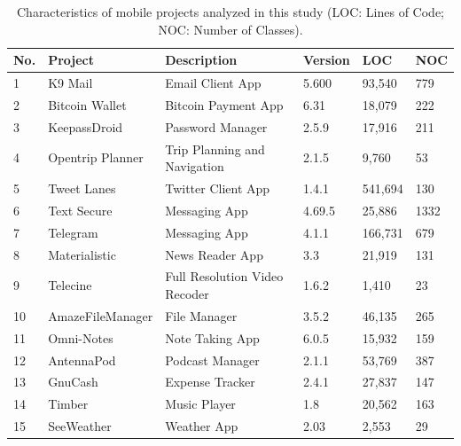 \documentclass[AMA,Times1COL]{WileyNJDv5} %
\begin{document}
\begin{table}[t]
	\caption{Characteristics of mobile projects analyzed in this study (LOC: Lines of Code; NOC: Number of Classes). } %
	\centering %
	\begin{tabular*}{\textwidth}{@{\extracolsep\fill}llllll@{\extracolsep\fill}}%
		\toprule
		\textbf{No.} & \textbf{Project} & \textbf{Description}  & \textbf{Version} & \textbf{LOC} & \textbf{NOC} \\ 
		\bottomrule
		1 & K9 Mail & Email Client App & 5.600 & 93,540 & 779 \\ 
		 2 & Bitcoin Wallet & Bitcoin Payment App & 6.31 & 18,079 & 222 \\ 
		3 &  KeepassDroid & Password Manager & 2.5.9 & 17,916 & 211 \\ 
		 4 & Opentrip Planner &  Trip Planning and Navigation & 2.1.5 & 9,760 & 53 \\ 
		5 & Tweet Lanes & Twitter Client App & 1.4.1 & 541,694 & 130 \\ 
		 6 & Text Secure & Messaging App & 4.69.5 & 25,886 & 1332 \\ 
		7 & Telegram & Messaging App & 4.1.1 & 166,731 & 679 \\ 
		 8 & Materialistic & News Reader App & 3.3 & 21,919 & 131 \\ 
		9 & Telecine & Full Resolution Video Recoder  & 1.6.2 & 1,410 & 23 \\ 
		 10 & AmazeFileManager & File Manager &  3.5.2 & 46,135 & 265 \\ 
		11 & Omni-Notes & Note Taking App & 6.0.5 & 15,932 & 159 \\ 
		 12 & AntennaPod & Podcast Manager & 2.1.1 & 53,769 & 387 \\ 
		13 & GnuCash & Expense Tracker & 2.4.1 & 27,837 & 147 \\ 
		 14 & Timber & Music Player & 1.8 & 20,562 & 163 \\ 
		15 & SeeWeather  & Weather App & 2.03 & 2,553 & 29 \\ 
		\bottomrule
	\end{tabular*}
	\label{table:selected_projects-mobile} %
\end{table}
\end{document}
